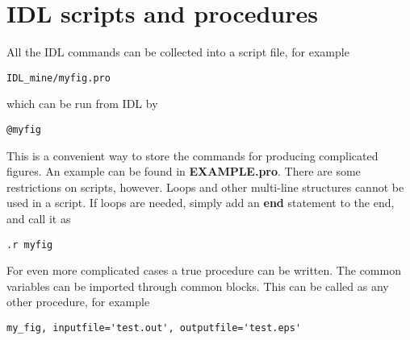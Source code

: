 \documentclass{article}
\begin{document}
\section{IDL scripts and procedures \label{s-idl-script}}

All the IDL commands can be collected into a script file, for example 
\begin{verbatim}
IDL_mine/myfig.pro
\end{verbatim}
which can be run from IDL by
\begin{verbatim}
@myfig
\end{verbatim}
This is a convenient way to store the commands for producing complicated 
figures. An example can be found in {\bf EXAMPLE.pro}. There are some
restrictions on scripts, however. Loops and other multi-line structures
cannot be used in a script. If loops are needed, simply add an 
{\bf end} statement to the end, and call it as
\begin{verbatim}
.r myfig
\end{verbatim}
For even more complicated cases a true procedure can be written.
The common variables can be imported through common blocks.
This can be called as any other procedure, for example
\begin{verbatim}
my_fig, inputfile='test.out', outputfile='test.eps'
\end{verbatim}
\end{document}
